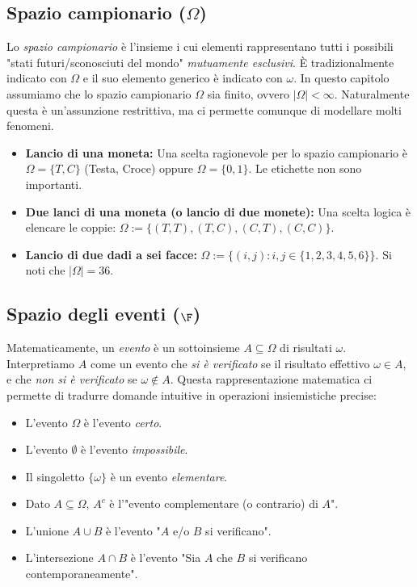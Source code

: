 \subsection{Spazio campionario ($\Omega$)}

Lo \emph{spazio campionario} è l'insieme i cui elementi rappresentano tutti i possibili "stati futuri/sconosciuti del mondo" \emph{mutuamente esclusivi}. È tradizionalmente indicato con $\Omega$ e il suo elemento generico è indicato con $\omega$. In questo capitolo assumiamo che lo spazio campionario $\Omega$ sia finito, ovvero $|\Omega| < \infty$. Naturalmente questa è un'assunzione restrittiva, ma ci permette comunque di modellare molti fenomeni.

\begin{esempio}
    \begin{itemize}
        \item \textbf{Lancio di una moneta:} Una scelta ragionevole per lo spazio campionario è $\Omega = \{T, C\}$ (Testa, Croce) oppure $\Omega = \{0, 1\}$. Le etichette non sono importanti.
        \item \textbf{Due lanci di una moneta (o lancio di due monete):} Una scelta logica è elencare le coppie: $\Omega := \{(T, T), (T, C), (C, T), (C, C)\}$.
        \item \textbf{Lancio di due dadi a sei facce:} $\Omega := \{(i, j) : i, j \in \{1, 2, 3, 4, 5, 6\}\}$. Si noti che $|\Omega| = 36$.
    \end{itemize}
\end{esempio}

\subsection{Spazio degli eventi ($\F$)}

Matematicamente, un \emph{evento} è un sottoinsieme $A \subseteq \Omega$ di risultati $\omega$. Interpretiamo $A$ come un evento che \emph{si è verificato} se il risultato effettivo $\omega \in A$, e che \emph{non si è verificato} se $\omega \notin A$. Questa rappresentazione matematica ci permette di tradurre domande intuitive in operazioni insiemistiche precise:
\begin{itemize}
    \item L'evento $\Omega$ è l'evento \emph{certo}.
    \item L'evento $\emptyset$ è l'evento \emph{impossibile}.
    \item Il singoletto $\{\omega\}$ è un evento \emph{elementare}.
    \item Dato $A \subseteq \Omega$, $A^c$ è l'"evento complementare (o contrario) di $A$".
    \item L'unione $A \cup B$ è l'evento "$A$ e/o $B$ si verificano".
    \item L'intersezione $A \cap B$ è l'evento "Sia $A$ che $B$ si verificano contemporaneamente".
\end{itemize}


